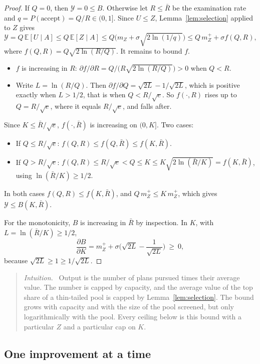 \documentclass[11pt]{article}
\theoremstyle{remark}
\newenvironment{intuition}{\begin{quote}\small\color{muted}\textit{Intuition.}\ }{\end{quote}}
\newcommand{\E}{\mathbb{E}}
\newcommand{\Ycal}{\mathcal{Y}}
\newcommand{\accept}{\text{accept}}
\begin{document}
\begin{proof}
If $Q=0$, then $\Ycal=0\le B$. Otherwise let $R\le\bar R$ be the examination rate and $q=P(\accept)=Q/R\in(0,1]$. Since $U\le Z$, Lemma~\ref{lem:selection} applied to $Z$ gives
\[
\Ycal=Q\,\E[U\mid A]\le Q\,\E[Z\mid A]\le Q\big(m_Z+\sigma\sqrt{2\ln(1/q)}\big)\le Q\,m_Z^++\sigma f(Q,R),
\]
where $f(Q,R)=Q\sqrt{2\ln(R/Q)}$. It remains to bound $f$.
\begin{itemize}
  \item $f$ is increasing in $R$: $\partial f/\partial R=Q/\big(R\sqrt{2\ln(R/Q)}\big)>0$ when $Q<R$.
  \item Write $L=\ln(R/Q)$. Then $\partial f/\partial Q=\sqrt{2L}-1/\sqrt{2L}$, which is positive exactly when $L>1/2$, that is when $Q<R/\sqrt e$. So $f(\cdot,R)$ rises up to $Q=R/\sqrt e$, where it equals $R/\sqrt e$, and falls after.
\end{itemize}
Since $K\le\bar R/\sqrt e$, $f(\cdot,\bar R)$ is increasing on $(0,K]$. Two cases:
\begin{itemize}
  \item If $Q\le R/\sqrt e$: $f(Q,R)\le f(Q,\bar R)\le f(K,\bar R)$.
  \item If $Q>R/\sqrt e$: $f(Q,R)\le R/\sqrt e<Q\le K\le K\sqrt{2\ln(\bar R/K)}=f(K,\bar R)$, using $\ln(\bar R/K)\ge1/2$.
\end{itemize}
In both cases $f(Q,R)\le f(K,\bar R)$, and $Q\,m_Z^+\le K\,m_Z^+$, which gives $\Ycal\le B(K,\bar R)$.

For the monotonicity, $B$ is increasing in $\bar R$ by inspection. In $K$, with $L=\ln(\bar R/K)\ge1/2$,
\[
\frac{\partial B}{\partial K}=m_Z^++\sigma\Big(\sqrt{2L}-\frac{1}{\sqrt{2L}}\Big)\ \ge\ 0,
\]
because $\sqrt{2L}\ge1\ge1/\sqrt{2L}$.
\end{proof}

\begin{intuition}
Output is the number of plans pursued times their average value. The number is capped by capacity, and the average value of the top share of a thin-tailed pool is capped by Lemma~\ref{lem:selection}. The bound grows with capacity and with the size of the pool screened, but only logarithmically with the pool. Every ceiling below is this bound with a particular $Z$ and a particular cap on $K$.
\end{intuition}

\subsection{One improvement at a time}
\end{document}
